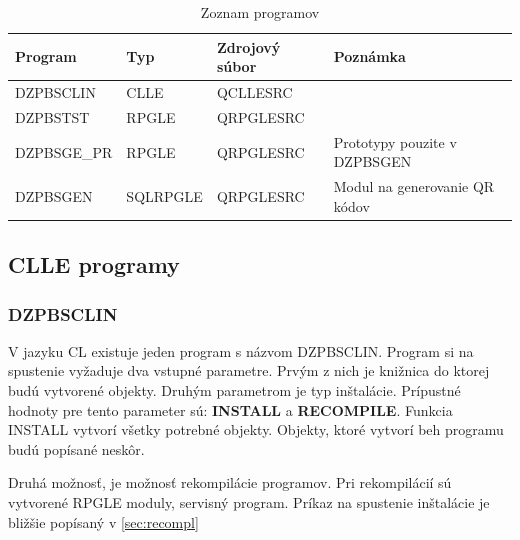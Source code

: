 \begin{table}[ht!]
\caption{Zoznam programov}
\label{tab:zoznam_programov}
\begin{tabular}{|l|l|l|l|}
\hline
\textbf{Program} & \textbf{Typ} & \textbf{Zdrojový súbor} & \textbf{Poznámka}             \\ \hline
DZPBSCLIN        & CLLE         & QCLLESRC                &                               \\ \hline
DZPBSTST         & RPGLE        & QRPGLESRC               &                               \\ \hline
DZPBSGE\_PR      & RPGLE        & QRPGLESRC               & Prototypy pouzite v DZPBSGEN  \\ \hline
DZPBSGEN         & SQLRPGLE     & QRPGLESRC               & Modul na generovanie QR kódov \\ \hline
\end{tabular}
\end{table}


\subsection{\acs{CLLE} programy}
\label{sub:CLLE_programy}
\subsubsection{DZPBSCLIN}
\label{subsub:DZPBSCLIN}
V jazyku CL existuje jeden program s názvom DZPBSCLIN. Program si na spustenie vyžaduje dva vstupné parametre. Prvým z nich je knižnica do ktorej budú vytvorené objekty. Druhým parametrom je typ inštalácie. Prípustné hodnoty pre tento parameter sú: \textbf{INSTALL} a \textbf{RECOMPILE}. Funkcia INSTALL vytvorí všetky potrebné objekty. Objekty, ktoré vytvorí beh programu budú popísané neskôr.

Druhá možnosť, je možnosť rekompilácie programov. Pri rekompilácií sú vytvorené RPGLE moduly, servisný program. Príkaz na spustenie inštalácie je bližšie popísaný v \ref{sec:recompl}

